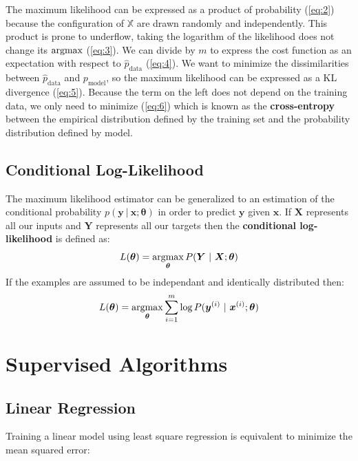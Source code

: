 \documentclass[12pt]{report}
\newcommand{\argmax}{\operatornamewithlimits{argmax}}
\begin{document}
            The maximum likelihood can be expressed as a product of probability (\ref{eq:2}) because the configuration of $\mathbb{X}$ are drawn randomly and independently. This product is prone to underflow, taking the logarithm of the likelihood does not change its $\argmax$ (\ref{eq:3}). We can divide by $m$ to express the cost function as an expectation with respect to $\hat{p}_{\text{data}}$ (\ref{eq:4}). We want to minimize the dissimilarities between $\hat{p}_{\text{data}}$ and $p_{\text{model}}$, so the maximum likelihood can be expressed as a KL divergence (\ref{eq:5}). Because the term on the left does not depend on the training data, we only need to minimize (\ref{eq:6}) which is known as the \textbf{cross-entropy} between the empirical distribution defined by the training set and the probability distribution defined by model.
            
            \subsection{Conditional Log-Likelihood}
                The maximum likelihood estimator can be generalized to an estimation of the conditional probability $p(\mathbf{y}~|~\mathbf{x}; \boldsymbol{\theta})$ in order to predict $\mathbf{y}$ given $\mathbf{x}$. If $\boldsymbol{X}$ represents all our inputs and $\boldsymbol{Y}$ represents all our targets then the \textbf{conditional log-likelihood} is defined as:
                \begin{equation}
                    L(\boldsymbol{\theta}) = \argmax_{\boldsymbol{\theta}}P(\boldsymbol{Y}~|~\boldsymbol{X};\boldsymbol{\theta})
                \end{equation}
                If the examples are assumed to be independant and identically distributed then:
                \begin{equation}
                    L(\boldsymbol{\theta}) = \argmax_{\boldsymbol{\theta}}\sum_{i=1}^{m}\text{log}\,{P(\boldsymbol{y}^{(i)}~|~\boldsymbol{x}^{(i)};\boldsymbol{\theta})}
                \end{equation}
        \section{Supervised Algorithms}
            \subsection{Linear Regression}
                Training a linear model using least square regression is equivalent to minimize the mean squared error:
\end{document}
